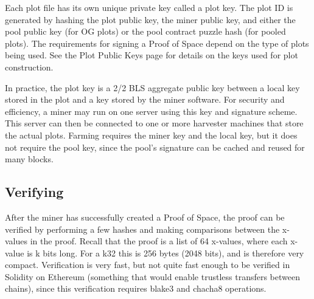 \begin{flushleft}
    Each plot file has its own unique private key called a plot key. The plot ID is generated by hashing the plot public key, the miner public key, and either the pool public key (for OG plots) or the pool contract puzzle hash (for pooled plots). The requirements for signing a Proof of Space depend on the type of plots being used. See the Plot Public Keys page for details on the keys used for plot construction.
\end{flushleft}
\begin{flushleft}
    In practice, the plot key is a 2/2 BLS aggregate public key between a local key stored in the plot and a key stored by the miner software. For security and efficiency, a miner may run on one server using this key and signature scheme. This server can then be connected to one or more harvester machines that store the actual plots. Farming requires the miner key and the local key, but it does not require the pool key, since the pool’s signature can be cached and reused for many blocks.
\end{flushleft}
\subsection{Verifying}
\begin{flushleft}
    After the miner has successfully created a Proof of Space, the proof can be verified by performing a few hashes and making comparisons between the x-values in the proof. Recall that the proof is a list of 64 x-values, where each x-value is k bits long. For a k32 this is 256 bytes (2048 bits), and is therefore very compact. Verification is very fast, but not quite fast enough to be verified in Solidity on Ethereum (something that would enable trustless transfers between chains), since this verification requires blake3 and chacha8 operations.
\end{flushleft}
